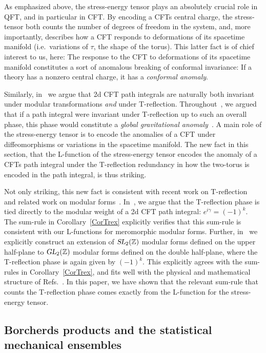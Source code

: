 \documentclass[11pt,a4paper]{article}
\newcommand{\g}{\gamma}
\def\Z{\mathbb{Z}}
\newcommand{\SL}{\operatorname{\textsl{SL}}}	 	%
\newcommand{\GL}{\operatorname{\textsl{GL}}}	%
\begin{document}
As emphasized above, the stress-energy tensor plays an absolutely crucial role in QFT, and in particular in CFT. By encoding a CFTs central charge, the stress-tensor both counts the number of degrees of freedom in the system, and, more importantly, describes how a CFT responds to deformations of its spacetime manifold (i.e.~variations of $\tau$, the shape of the torus). This latter fact is of chief interest to us, here: The response to the CFT to deformations of its spacetime manifold constitutes a sort of anomalous breaking of conformal invariance: If a theory has a nonzero central charge, it has a {\em conformal anomaly}. 

Similarly, in~\cite{07T-rex2} we argue that 2d CFT path integrals are naturally both invariant under modular transformations {\em and} under T-reflection. Throughout~\cite{06T-rex1, 07T-rex2}, we argued that if a path integral were invariant under T-reflection up to such an overall phase, this phase would constitute a {\em global gravitational anomaly}~\cite{31-Witten84, 32-HeteroticII, 33-Polchinski-II}. A main role of the stress-energy tensor is to encode the anomalies of a CFT under diffeomorphisms or variations in the spacetime manifold. The new fact in this section, that the L-function of the stress-energy tensor encodes the anomaly of a CFTs path integral under the T-reflection redundancy in how the two-torus is encoded in the path integral, is thus striking. 

Not only striking, this new fact is consistent with recent work on T-reflection~\cite{06T-rex1, 07T-rex2} and related work on modular forms~\cite{30T-rex2-GL2}. In~\cite{07T-rex2}, we argue that the T-reflection phase is tied directly to the modular weight of a 2d CFT path integral: $e^{i \g} = (-1)^k$. The sum-rule in Corollary~\ref{CorTrex} explicitly verifies that this sum-rule is consistent with our L-functions for meromorphic modular forms. Further, in~\cite{30T-rex2-GL2} we explicitly construct an extension of $\SL_2(\Z)$ modular forms defined on the upper half-plane to $\GL_2(\Z)$ modular forms defined on the double half-plane, where the T-reflection phase is again given by $(-1)^k$. This explicitly agrees with the sum-rules in Corollary~\ref{CorTrex}, and fits well with the physical and mathematical structure of Refs.~\cite{06T-rex1, 07T-rex2, 30T-rex2-GL2}. In this paper, we have shown that the relevant sum-rule that counts the T-reflection phase comes exactly from the L-function for the stress-energy tensor.  

\subsection{Borcherds products and the statistical mechanical ensembles}\label{secEnsemble}
\end{document}

